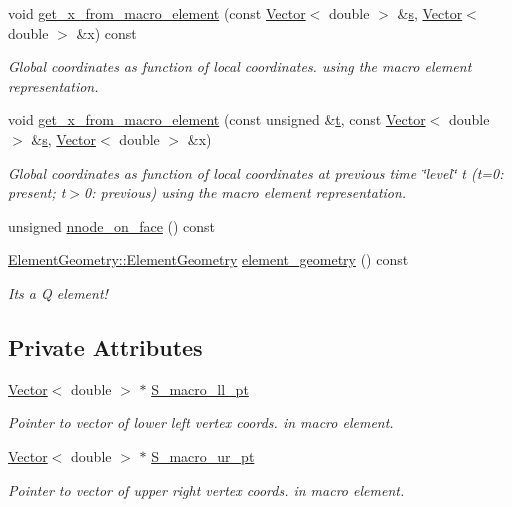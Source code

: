 \begin{DoxyCompactItemize}
void \hyperlink{classoomph_1_1QElementBase_a9382eae5e06bceba2d107592ad111075}{get\+\_\+x\+\_\+from\+\_\+macro\+\_\+element} (const \hyperlink{classoomph_1_1Vector}{Vector}$<$ double $>$ \&\hyperlink{cfortran_8h_ab7123126e4885ef647dd9c6e3807a21c}{s}, \hyperlink{classoomph_1_1Vector}{Vector}$<$ double $>$ \&x) const
\begin{DoxyCompactList}\small\item\em Global coordinates as function of local coordinates. using the macro element representation. \end{DoxyCompactList}\item 
void \hyperlink{classoomph_1_1QElementBase_a61b722ea5221157266b894bdbb255011}{get\+\_\+x\+\_\+from\+\_\+macro\+\_\+element} (const unsigned \&\hyperlink{cfortran_8h_af6f0bd3dc13317f895c91323c25c2b8f}{t}, const \hyperlink{classoomph_1_1Vector}{Vector}$<$ double $>$ \&\hyperlink{cfortran_8h_ab7123126e4885ef647dd9c6e3807a21c}{s}, \hyperlink{classoomph_1_1Vector}{Vector}$<$ double $>$ \&x)
\begin{DoxyCompactList}\small\item\em Global coordinates as function of local coordinates at previous time \char`\"{}level\char`\"{} t (t=0\+: present; t$>$0\+: previous) using the macro element representation. \end{DoxyCompactList}\item 
unsigned \hyperlink{classoomph_1_1QElementBase_ab5f6a8eda4ea33ebc15b3b5fb623ec80}{nnode\+\_\+on\+\_\+face} () const
\item 
\hyperlink{namespaceoomph_1_1ElementGeometry_a86ff99972b0205d7524e294c58c1182a}{Element\+Geometry\+::\+Element\+Geometry} \hyperlink{classoomph_1_1QElementBase_a3e802dea8060d1b95c2fe505e0b0df1f}{element\+\_\+geometry} () const
\begin{DoxyCompactList}\small\item\em It\textquotesingle{}s a Q element! \end{DoxyCompactList}\end{DoxyCompactItemize}
\subsection*{Private Attributes}
\begin{DoxyCompactItemize}
\item 
\hyperlink{classoomph_1_1Vector}{Vector}$<$ double $>$ $\ast$ \hyperlink{classoomph_1_1QElementBase_ad4230bf2166814292978c6ea970a0ff1}{S\+\_\+macro\+\_\+ll\+\_\+pt}
\begin{DoxyCompactList}\small\item\em Pointer to vector of lower left vertex coords. in macro element. \end{DoxyCompactList}\item 
\hyperlink{classoomph_1_1Vector}{Vector}$<$ double $>$ $\ast$ \hyperlink{classoomph_1_1QElementBase_a2799b73c77a7d6bcff3e0f78d6bf0876}{S\+\_\+macro\+\_\+ur\+\_\+pt}
\begin{DoxyCompactList}\small\item\em Pointer to vector of upper right vertex coords. in macro element. \end{DoxyCompactList}\end{DoxyCompactItemize}
